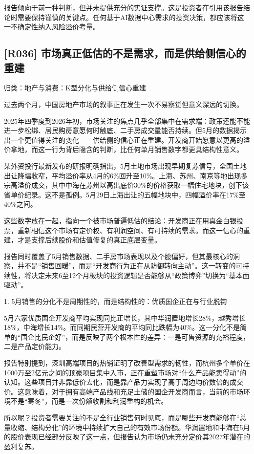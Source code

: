 \documentclass[11pt]{ctexart}
\begin{document}
报告倾向于前一种判断，但并未提供充分的实证支撑。这是投资者在引用该报告结论时需要保持谨慎的关键点。任何基于AI数据中心需求的投资决策，都应该将这一不确定性纳入风险溢价考量。

\subsection{[R036] 市场真正低估的不是需求，而是供给侧信心的重建}
{\small\color{refgray}归类：地产与消费：K型分化与供给侧信心重建}

过去两个月，中国房地产市场的叙事正在发生一次不易察觉但意义深远的切换。

2025年四季度到2026年初，市场关注的焦点几乎全部集中在需求端：政策还能不能进一步松绑、居民购房意愿何时触底、二手房成交量能否持续。但5月的数据揭示出一个更值得关注的变化——供给侧的信心正在重建。开发商开始愿意以更高的溢价拿地，而这一行为背后隐含的判断，比任何单月销售数字都更具结构性意义。

某外资投行最新发布的研报明确指出，5月土地市场出现早期复苏信号，全国土地出让降幅收窄，平均溢价率从4月的6\%回升至10\%。上海、苏州、南京等地出现多宗高溢价成交，其中中海在苏州以高出底价30\%的价格获取一幅住宅地块，创下该省单价纪录。这不是孤例。5月29日上海出让的五幅地块中，四幅溢价率在17\%至40\%之间。

这些数字放在一起，指向一个被市场普遍低估的结论：开发商正在用真金白银投票，重新相信这个市场有定价权、有利润空间、有可持续的需求。而这一信心的重建，才是支撑后续股价和估值修复的真正底层变量。

报告同时覆盖了5月销售数据、二手房市场表现以及个股偏好，但其最核心的洞察，并不是“销售回暖”，而是“开发商行为正在从防御转向主动”。这一转变的可持续性，将决定未来6至12个月板块的投资逻辑是否能够从“政策博弈”切换为“基本面驱动”。

1. 5月销售的分化不是周期性的，而是结构性的：优质国企正在与行业脱钩

5月六家优质国企开发商平均实现同比正增长，其中华润置地增长28\%，越秀增长18\%，中海增长14\%。而同期民营开发商的平均同比跌幅为40\%。这一分化不是简单的“国企比民企好”，而是反映了两个根本性的差异：一是可售资源的充裕程度，二是产品定价能力。

报告特别提到，深圳高端项目的热销证明了改善型需求的韧性，而杭州多个单价在1000万至2亿元之间的顶豪项目集中入市，正在重塑市场对“什么产品能卖得动”的认知。这些项目并非靠低价去化，而是靠产品力实现了高于周边均价数倍的成交价。这意味着，对于拥有高端产品线和充足土储的国企开发商而言，当前的市场环境不是“寒冬”，而是一次份额收割和利润重构的机会。

所以呢？投资者需要关注的不是全行业销售何时见底，而是哪些开发商能够在“总量收缩、结构分化”的环境中持续扩大自己的有效市场份额。华润置地和中海在5月的股价表现已经部分反映了这一点，但报告认为市场仍未充分定价其2027年潜在的盈利复苏。
\end{document}
